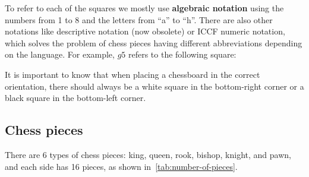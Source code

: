 \vspace{1em}

\noindent To refer to each of the squares we mostly use \textbf{algebraic notation} using the numbers from 1 to 8 and the letters from ``a'' to ``h''. There are also other notations like descriptive notation (now obsolete) or ICCF numeric notation, which solves the problem of chess pieces having different abbreviations depending on the language. For example, $g5$ refers to the following square:

\begin{center}
    \newchessgame %
    \chessboard[
        setpieces={}, %
        showmover=false,
        markstyle=circle, color=red, markfield=g5, %
        pgfstyle=straightmove, color=blue, %
        markmoves={g1-g5, a5-g5}, %
        arrow=to %
    ]
\end{center}

\noindent It is important to know that when placing a chessboard in the correct orientation, there should always be a white square in the bottom-right corner or a black square in the bottom-left corner.

\newpage

\subsection*{Chess pieces}

There are 6 types of chess pieces: king, queen, rook, bishop, knight, and pawn, and each side has 16 pieces, as shown in~\cref{tab:number-of-pieces}.

\vspace{1em}

